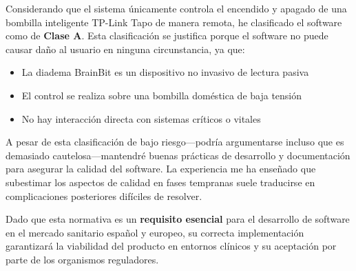 Considerando que el sistema únicamente controla el encendido y apagado de una bombilla inteligente TP-Link Tapo de manera remota, he clasificado el software como de \textbf{Clase A}. Esta clasificación se justifica porque el software no puede causar daño al usuario en ninguna circunstancia, ya que:
\begin{itemize}
    \item La diadema BrainBit es un dispositivo no invasivo de lectura pasiva
    \item El control se realiza sobre una bombilla doméstica de baja tensión
    \item No hay interacción directa con sistemas críticos o vitales
\end{itemize}

A pesar de esta clasificación de bajo riesgo—podría argumentarse incluso que es demasiado cautelosa—mantendré buenas prácticas de desarrollo y documentación para asegurar la calidad del software. La experiencia me ha enseñado que subestimar los aspectos de calidad en fases tempranas suele traducirse en complicaciones posteriores difíciles de resolver.

Dado que esta normativa es un \textbf{requisito esencial} para el desarrollo de software en el mercado sanitario español y europeo, su correcta implementación garantizará la viabilidad del producto en entornos clínicos y su aceptación por parte de los organismos reguladores. 
